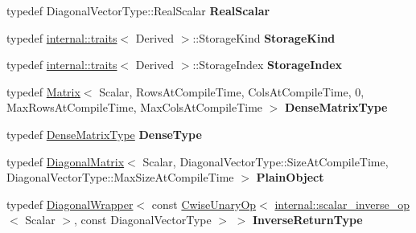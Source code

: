 \begin{DoxyCompactItemize}
typedef Diagonal\+Vector\+Type\+::\+Real\+Scalar {\bfseries Real\+Scalar}
\item 
\mbox{\label{class_eigen_1_1_diagonal_base_a093f1f20c042b2624e42645e407a2d6a}} 
typedef \hyperlink{struct_eigen_1_1internal_1_1traits}{internal\+::traits}$<$ Derived $>$\+::Storage\+Kind {\bfseries Storage\+Kind}
\item 
\mbox{\label{class_eigen_1_1_diagonal_base_a0850b562c94689d6f1b24805749fa127}} 
typedef \hyperlink{struct_eigen_1_1internal_1_1traits}{internal\+::traits}$<$ Derived $>$\+::Storage\+Index {\bfseries Storage\+Index}
\item 
\mbox{\label{class_eigen_1_1_diagonal_base_a5b03ccd914288064b6db84176fde6643}} 
typedef \hyperlink{group___core___module_class_eigen_1_1_matrix}{Matrix}$<$ Scalar, Rows\+At\+Compile\+Time, Cols\+At\+Compile\+Time, 0, Max\+Rows\+At\+Compile\+Time, Max\+Cols\+At\+Compile\+Time $>$ {\bfseries Dense\+Matrix\+Type}
\item 
\mbox{\label{class_eigen_1_1_diagonal_base_ab57e4c5bcb838b2fbfb7bcc6c828e3b1}} 
typedef \hyperlink{group___core___module_class_eigen_1_1_matrix}{Dense\+Matrix\+Type} {\bfseries Dense\+Type}
\item 
\mbox{\label{class_eigen_1_1_diagonal_base_a12790179b6a63c133521233851728448}} 
typedef \hyperlink{group___core___module_class_eigen_1_1_diagonal_matrix}{Diagonal\+Matrix}$<$ Scalar, Diagonal\+Vector\+Type\+::\+Size\+At\+Compile\+Time, Diagonal\+Vector\+Type\+::\+Max\+Size\+At\+Compile\+Time $>$ {\bfseries Plain\+Object}
\item 
\mbox{\label{class_eigen_1_1_diagonal_base_abf3d0ad516e702c213e11f28bae2eb14}} 
typedef \hyperlink{group___core___module_class_eigen_1_1_diagonal_wrapper}{Diagonal\+Wrapper}$<$ const \hyperlink{group___core___module_class_eigen_1_1_cwise_unary_op}{Cwise\+Unary\+Op}$<$ \hyperlink{struct_eigen_1_1internal_1_1scalar__inverse__op}{internal\+::scalar\+\_\+inverse\+\_\+op}$<$ Scalar $>$, const Diagonal\+Vector\+Type $>$ $>$ {\bfseries Inverse\+Return\+Type}
\item 
\mbox{\label{class_eigen_1_1_diagonal_base_a1f8d7fbcf424eca7f639213484a2d51b}} 

\end{DoxyCompactItemize}
